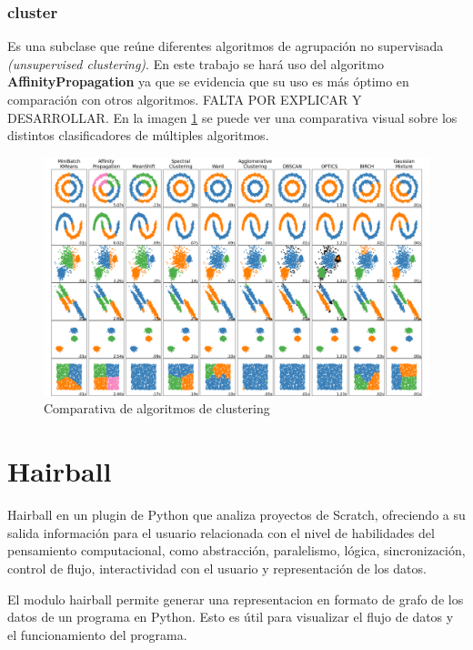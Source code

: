 \documentclass[a4paper, 12pt]{book}
\begin{document}
\subsubsection{cluster}
\label{sec:sklearn_cluster}

Es una subclase que reúne diferentes algoritmos de agrupación no supervisada \textit{(unsupervised clustering)}. En este trabajo se hará uso del algoritmo \textbf{AffinityPropagation} ya que se evidencia que su uso es más óptimo en comparación con otros algoritmos. FALTA POR EXPLICAR Y DESARROLLAR. En la imagen \ref{fig:comparativa_algoritmos} se puede ver una comparativa visual sobre los distintos clasificadores de múltiples algoritmos. 

\begin{figure}[!h]
    \centering
    \includegraphics[width=16cm, keepaspectratio]{img/algorithm_comparison.png}
    \caption{Comparativa de algoritmos de clustering}
    \label{fig:comparativa_algoritmos}
\end{figure}

\section{Hairball} 
\label{sec:Hairball}

Hairball en un plugin de Python que analiza proyectos de Scratch, ofreciendo a su salida información para el usuario relacionada con el nivel de habilidades del pensamiento computacional, como abstracción, paralelismo, lógica, sincronización, control de flujo, interactividad con el usuario y representación de los datos.

El modulo hairball permite generar una representacion en formato de grafo de los datos de un programa en Python. Esto es útil para visualizar el flujo de datos y el funcionamiento del programa.
\end{document}
